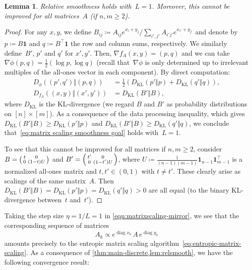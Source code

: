 \documentclass[11pt,letterpaper]{article}
\newtheorem{lemma}[theorem]{Lemma}\AddToHook{env/lemma/begin}{\crefalias{theorem}{lemma}}
\numberwithin{equation}{section}
\DeclareMathOperator{\diag}{diag}
\begin{document}
\begin{lemma}
Relative smoothness holds with~$L=1$.
Moreover, this cannot be improved for all matrices~$A$ (if $n,m\geq2$).
\end{lemma}
\begin{proof}
For any $x,y$, we define $B_{ij} \coloneqq A_{ij}e^{x_i +y_j} / \sum_{i', j'}A_{i'j'}e^{x_{i'} +y_{j'}}$ and denote by $p \coloneqq B\bm{1}$ and $q \coloneqq B^\top\bm{1}$ the row and column sums, respectively.
We similarly define~$B'$, $p'$ and $q'$ for $x',y'$.
Then, $\nabla f_A(x, y) = (p, q)$ and we can take $\nabla\phi(p,q) = \frac12 (\log p, \log q)$ (recall that~$\nabla\phi$ is only determined up to irrelevant multiples of the all-ones vector in each component).
By direct computation:
\begin{align*}
    D_\phi((p',q')\Vert (p,q)) &= \frac12 \left( D_{\mathrm{KL}}(p' \Vert p) + D_{\mathrm{KL}}(q' \Vert q) \right), \\
    D_{f_A}((x,y) \Vert (x',y')) &= D_{\mathrm{KL}}(B'\Vert B),
\end{align*}
where $D_{\mathrm{KL}}$ is the KL-divergence (we regard $B$ and $B'$ as probability distributions on $[n]\times[m]$).
As a consequence of the data processing inequality, which gives $D_{\mathrm{KL}}(B'\Vert B) \geq D_{\mathrm{KL}}(p'\Vert p)$ and $D_{\mathrm{KL}}(B'\Vert B) \geq D_{\mathrm{KL}}(q'\Vert q)$, we conclude that~\eqref{eq:matrix scaling smoothness goal} holds with~$L=1$.

To see that this cannot be improved for all matrices if $n,m\geq2$, consider $B=\begin{psmallmatrix}t&0\\0&(1-t)U\end{psmallmatrix}$ and $B'=\begin{psmallmatrix}t'&0\\0&(1-t')U\end{psmallmatrix}$, where $U \coloneqq \frac1{(n-1)(m-1)} \bm{1}_{n-1}\bm{1}_{m-1}^\top$ is a normalized all-ones matrix and $t, t'\in(0,1)$ with $t \neq t'$.
These clearly arise as scalings of the same matrix~$A$.
Then $D_{\mathrm{KL}}(B'\Vert B)
= D_{\mathrm{KL}}(p' \Vert p)
= D_{\mathrm{KL}}(q' \Vert q)
> 0$
are all equal (to the binary KL-divergence between~$t$ and~$t'$).
\end{proof}

Taking the step size $\eta=1/L=1$ in \cref{eqn:matrixscaling-mirror}, we see that the corresponding sequence of matrices
\begin{equation}\label{eq:matrixscaling-correspondence}
    A_k \propto e^{\diag x_k}\, A \, e^{\diag y_k}
\end{equation}
amounts precisely to the entropic matrix scaling algorithm~\eqref{eq:entropic-matrix-scaling}.
As a consequence of \cref{thm:main-discrete,lem:relsmooth}, we have the following convergence result:
\end{document}
